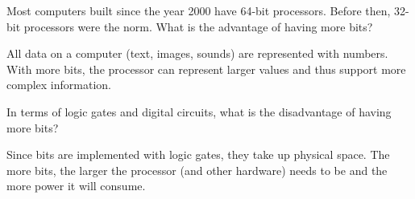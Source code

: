 \Q Most computers built since the year 2000 have 64-bit processors.
Before then, 32-bit processors were the norm.
What is the advantage of having more bits?

\begin{answer}
All data on a computer (text, images, sounds) are represented with numbers.
With more bits, the processor can represent larger values and thus support more complex information.
\end{answer}


\Q In terms of logic gates and digital circuits, what is the disadvantage of having more bits?

\begin{answer}
Since bits are implemented with logic gates, they take up physical space.
The more bits, the larger the processor (and other hardware) needs to be and the more power it will consume.
\end{answer}
